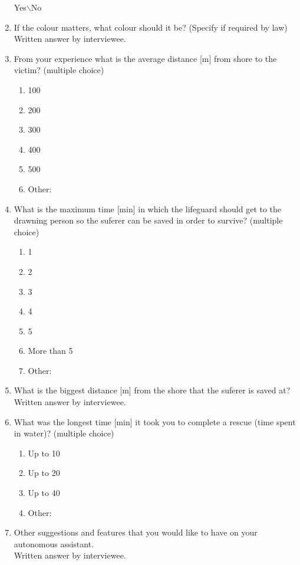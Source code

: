 \documentclass{article}[10pt]
\begin{document}
\begin{enumerate}
            Yes$\backslash$No
    \item If the colour matters, what colour should it be? (Specify if required by law)\\
            Written answer by interviewee.
            \newpage
    \item From your experience what is the average distance [m] from shore to the victim? (multiple choice) 
    \begin{enumerate}    
        \item  100
        \item  200
        \item  300
        \item  400
        \item  500
        \item  Other:
        \end{enumerate}
    \item What is the maximum time [min] in which the lifeguard should get to the drawning person so the suferer can be saved in order to survive? (multiple choice)
    \begin{enumerate}        
        \item   1
        \item   2
        \item   3
        \item   4
        \item   5
        \item   More than 5
        \item   Other:
    \end{enumerate}
    \item What is the biggest distance [m] from the shore that the suferer is saved at?\\
            Written answer by interviewee.
    \item What was the longest time [min] it took you to complete a rescue (time spent in water)? (multiple choice)
    \begin{enumerate}
        \item  Up to 10
        \item  Up to 20
        \item  Up to 40
        \item  Other:
    \end{enumerate}
    \item Other suggestions and features that you would like to have on your autonomous assistant.\\
            Written answer by interviewee.     
\end{enumerate}
\end{document}
